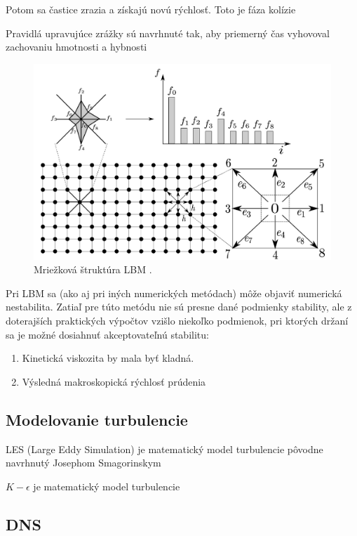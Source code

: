 \documentclass[]{tukediphc}
\begin{document}
Potom sa častice zrazia a získajú novú rýchlosť. Toto je fáza kolízie

Pravidlá upravujúce zrážky sú navrhnuté tak, aby priemerný čas vyhovoval zachovaniu hmotnosti a hybnosti

\begin{figure}[!ht]
	\centering
	\includegraphics[width=.7\textwidth,angle=0]{figures/lbm-grid.jpg}
	\caption{Mriežková štruktúra LBM \citep{Soga2020}.}
\end{figure}

Pri LBM sa (ako aj pri iných numerických metódach) môže objaviť numerická nestabilita. Zatiaľ pre túto metódu nie sú presne dané podmienky stability, ale z doterajších praktických výpočtov vzišlo niekoľko podmienok, pri ktorých držaní sa je možné dosiahnuť akceptovateľnú stabilitu:

\begin{enumerate}
	\item{Kinetická viskozita by mala byť kladná.}
	\item{Výsledná makroskopická rýchlosť prúdenia}
\end{enumerate}


\subsection{Modelovanie turbulencie}

LES (Large Eddy Simulation) je matematický model turbulencie pôvodne navrhnutý Josephom Smagorinskym


$K-\epsilon$ je matematický model turbulencie

\subsection{DNS}
\end{document}
